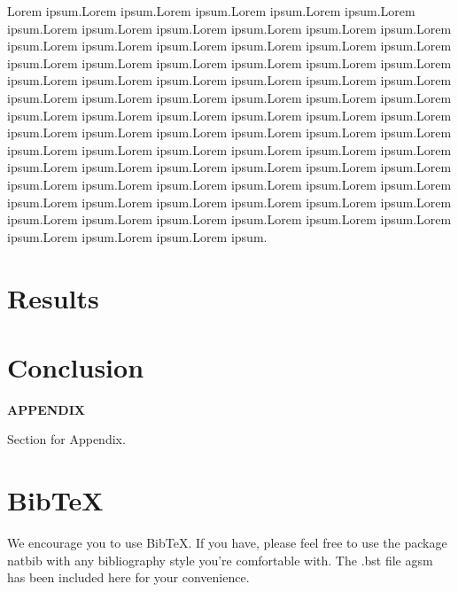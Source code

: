 \documentclass[
  11pt]{article}
\begin{document}
Lorem ipsum.Lorem ipsum.Lorem ipsum.Lorem ipsum.Lorem ipsum.Lorem
ipsum.Lorem ipsum.Lorem ipsum.Lorem ipsum.Lorem ipsum.Lorem ipsum.Lorem
ipsum.Lorem ipsum.Lorem ipsum.Lorem ipsum.Lorem ipsum.Lorem ipsum.Lorem
ipsum.Lorem ipsum.Lorem ipsum.Lorem ipsum.Lorem ipsum.Lorem ipsum.Lorem
ipsum.Lorem ipsum.Lorem ipsum.Lorem ipsum.Lorem ipsum.Lorem ipsum.Lorem
ipsum.Lorem ipsum.Lorem ipsum.Lorem ipsum.Lorem ipsum.Lorem ipsum.Lorem
ipsum.Lorem ipsum.Lorem ipsum.Lorem ipsum.Lorem ipsum.Lorem ipsum.Lorem
ipsum.Lorem ipsum.Lorem ipsum.Lorem ipsum.Lorem ipsum.Lorem ipsum.Lorem
ipsum.Lorem ipsum.Lorem ipsum.Lorem ipsum.Lorem ipsum.Lorem ipsum.Lorem
ipsum.Lorem ipsum.Lorem ipsum.Lorem ipsum.Lorem ipsum.Lorem ipsum.Lorem
ipsum.Lorem ipsum.Lorem ipsum.Lorem ipsum.Lorem ipsum.Lorem ipsum.Lorem
ipsum.Lorem ipsum.Lorem ipsum.Lorem ipsum.Lorem ipsum.Lorem ipsum.Lorem
ipsum.Lorem ipsum.Lorem ipsum.Lorem ipsum.Lorem ipsum.Lorem ipsum.Lorem
ipsum.Lorem ipsum.Lorem ipsum.Lorem ipsum.

\section{Results}\label{sec-result}

\section{Conclusion}\label{sec-conc}

\label{appendix}
\bigskip

\begin{center}

{\large\bf APPENDIX}

\end{center}

Section for Appendix.

\section{BibTeX}\label{bibtex}

We encourage you to use BibTeX. If you have, please feel free to use the
package natbib with any bibliography style you're comfortable with. The
.bst file agsm has been included here for your convenience.


  
\end{document}
